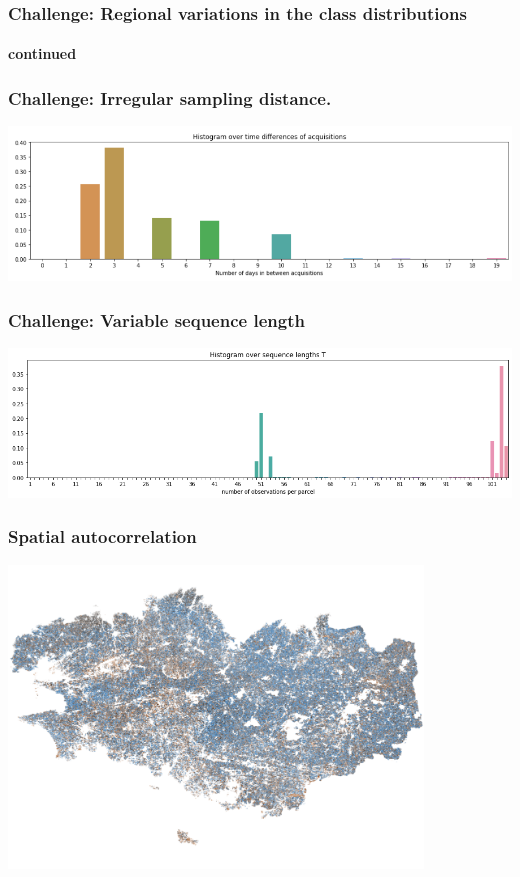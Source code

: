 \documentclass[%
  aspectratio=169,
  9pt,
  USenglish,
  titlegraphic, %
  affiliationintitlepagehead,
  affiliation,
]{beamer}
\begin{document}
\begin{frame}
	\frametitle{Challenge: Regional variations in the class distributions}
	\framesubtitle{continued}

	\centering
	
\end{frame}

\begin{frame}
\frametitle{Challenge: Irregular sampling distance.}

\includegraphics[width=\textwidth]{images/days_between_acquisitions}

\end{frame}

\begin{frame}
\frametitle{Challenge: Variable sequence length}
\includegraphics[width=\textwidth]{images/sequencelengths}

\end{frame}

\begin{frame}
	\frametitle{Spatial autocorrelation}
	
	\includegraphics[width=11cm]{images/map/breizh}
	
	
\end{frame}
\end{document}

